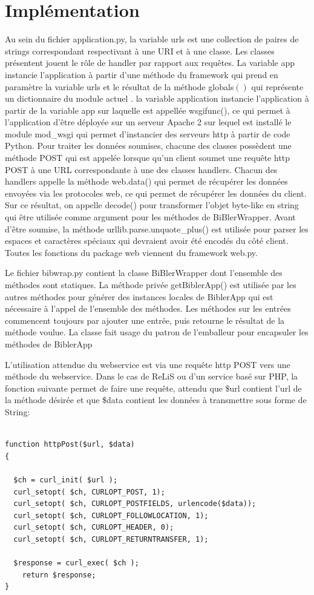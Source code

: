 \documentclass[12pt,titlepage]{article}
\let\oldsection\section
\renewcommand\section{\clearpage\oldsection}
\begin{document}
\section{Implémentation}
Au sein du fichier application.py,  la variable urls est une collection de paires de strings correspondant respectivant à une URI et à une classe. Les classes présentent jouent le rôle de handler par rapport aux requêtes. La variable app instancie l'application à partir d'une méthode du framework qui prend en paramètre la variable urls et le résultat de la méthode globals$()$ qui représente un dictionnaire du module actuel \cite{PDa}. la variable application instancie l'application à partir de la variable app sur laquelle est appellée wsgifunc(), ce qui permet à l'application d'être déployée sur un serveur Apache 2 sur lequel est installé le module mod\_wsgi qui permet d'instancier des serveurs http à partir de code Python. Pour traiter les données soumises, chacune des classes possèdent une méthode POST qui est appelée lorsque qu'un client soumet une requête http POST à une URL correspondante à une des classes handlers. Chacun des handlers appelle la méthode web.data() qui permet de récupérer les données envoyées via les protocoles web, ce qui permet de récupérer les données du client. Sur ce résultat, on appelle decode() pour transformer l'objet byte-like en string qui être utilisée comme argument pour les méthodes de BiBlerWrapper. Avant d'être soumise, la méthode urllib.parse.unquote\_plus() est utilisée pour parser les espaces et caractères spéciaux qui devraient avoir été encodés du côté client. Toutes les fonctions du package web viennent du framework web.py. \newline

Le fichier bibwrap.py contient la classe BiBlerWrapper dont l'ensemble des méthodes sont statiques. La méthode privée getBiblerApp() est utilisée par les autres méthodes pour générer des instances locales de BiblerApp qui est nécessaire à l'appel de l'ensemble des méthodes. Les méthodes sur les entrées commencent toujours par ajouter une entrée, puis retourne le résultat de la méthode voulue. La classe fait usage du patron de l'emballeur pour encapsuler les méthodes de BiblerApp \newline

L'utilisation attendue du webservice est via une requête http POST vers une méthode du webservice. Dans le cas de ReLiS ou d'un service basé sur PHP, la fonction suivante permet de faire une requête, attendu que \$url contient l'url de la méthode désirée et que \$data contient les données à transmettre sous forme de String: 
\begin{lstlisting}

function httpPost($url, $data)
{

  $ch = curl_init( $url );
  curl_setopt( $ch, CURLOPT_POST, 1);
  curl_setopt( $ch, CURLOPT_POSTFIELDS, urlencode($data));
  curl_setopt( $ch, CURLOPT_FOLLOWLOCATION, 1);
  curl_setopt( $ch, CURLOPT_HEADER, 0);
  curl_setopt( $ch, CURLOPT_RETURNTRANSFER, 1);

  $response = curl_exec( $ch );
    return $response;
}

\end{lstlisting}
\end{document}
